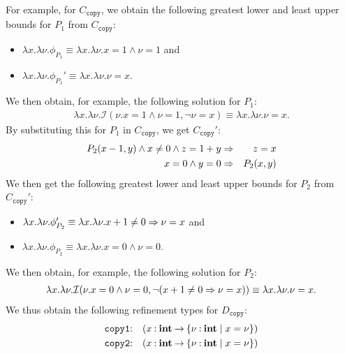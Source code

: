 \vspace{-4pt}
%
For example, for \(C_{\texttt{copy}}\), we obtain the following greatest
lower and least upper bounds for \(P_1\) from \(C_{\texttt{copy}}\):
\vspace{-4pt}
\begin{itemize}
\item \(\lambda x.\lambda \nu.\phi_{P_1}\equiv \lambda x.\lambda \nu.x=1 \land \nu=1\) and
\item \(\lambda x.\lambda \nu.\phi_{P_1}'\equiv \lambda x.\lambda \nu.\nu=x\).
\end{itemize}
\vspace{-4pt}
We then obtain, for example, the following solution for \(P_1\):
\begin{eqnarray*}
\lambda x.\lambda \nu.\mathcal{I}(\nu.x=1 \land \nu=1,\neg \nu=x) \equiv \lambda x.\lambda \nu.\nu=x.
\end{eqnarray*}
By substituting this for \(P_1\) in \(C_{\texttt{copy}}\), we get
\(C_{\texttt{copy}}'\):
\begin{eqnarray*}
P_2(x-1,y) \land x\neq0 \land z=1+y &\Rightarrow& z=x \\
x=0 \land y=0 &\Rightarrow& P_2(x,y)
\end{eqnarray*}
We then get the following greatest lower and least upper bounds for
\(P_2\) from \(C_{\texttt{copy}}'\):
\vspace{-4pt}
\begin{itemize}
\item \(\lambda x.\lambda \nu. \phi_{P_2}' \equiv \lambda x.\lambda \nu. x+1\neq0 \Rightarrow \nu=x\) and
\item \(\lambda x.\lambda \nu. \phi_{P_2} \equiv \lambda x.\lambda \nu. x=0 \land \nu=0\).
\end{itemize}
\vspace{-4pt}
We then obtain, for example, the following solution for \(P_2\):
\begin{eqnarray*}
\lambda x.\lambda \nu.\mathcal{I}(\nu.x=0 \land \nu=0,\neg (x+1\neq0 \Rightarrow \nu=x)) \equiv \lambda x.\lambda \nu.\nu=x.
\end{eqnarray*}
We thus obtain the following refinement types for \(D_{\texttt{copy}}\):
\begin{eqnarray*}
\texttt{copy1}&\mathbin{:}&(x\mathbin{:}{\mathbf{int}}\mathbin{\rightarrow}{\{{\nu\mathbin{:}\mathbf{int} \mid x=\nu}\}}) \\
\texttt{copy2}&\mathbin{:}&(x\mathbin{:}{\mathbf{int}}\mathbin{\rightarrow}{\{{\nu\mathbin{:}\mathbf{int} \mid x=\nu}\}})
\end{eqnarray*}

\vspace{-2pt}

